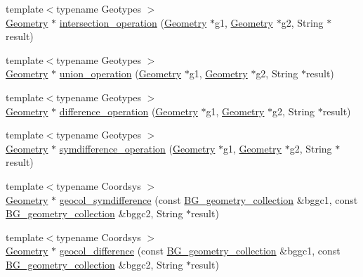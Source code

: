 \begin{DoxyCompactItemize}
{\footnotesize template$<$typename Geotypes $>$ }\\\mbox{\hyperlink{classGeometry}{Geometry}} $\ast$ \mbox{\hyperlink{classItem__func__spatial__operation_ac3f0b6c08ba648eafb07e6c274ee9c59}{intersection\+\_\+operation}} (\mbox{\hyperlink{classGeometry}{Geometry}} $\ast$g1, \mbox{\hyperlink{classGeometry}{Geometry}} $\ast$g2, String $\ast$result)
\item 
{\footnotesize template$<$typename Geotypes $>$ }\\\mbox{\hyperlink{classGeometry}{Geometry}} $\ast$ \mbox{\hyperlink{classItem__func__spatial__operation_a8d9dbfc298e9f8a3fbf140168e992197}{union\+\_\+operation}} (\mbox{\hyperlink{classGeometry}{Geometry}} $\ast$g1, \mbox{\hyperlink{classGeometry}{Geometry}} $\ast$g2, String $\ast$result)
\item 
{\footnotesize template$<$typename Geotypes $>$ }\\\mbox{\hyperlink{classGeometry}{Geometry}} $\ast$ \mbox{\hyperlink{classItem__func__spatial__operation_a3c362428b07f46f367c2e1e35f17cf40}{difference\+\_\+operation}} (\mbox{\hyperlink{classGeometry}{Geometry}} $\ast$g1, \mbox{\hyperlink{classGeometry}{Geometry}} $\ast$g2, String $\ast$result)
\item 
{\footnotesize template$<$typename Geotypes $>$ }\\\mbox{\hyperlink{classGeometry}{Geometry}} $\ast$ \mbox{\hyperlink{classItem__func__spatial__operation_ae775d509dca190eff1d735dd13c512a7}{symdifference\+\_\+operation}} (\mbox{\hyperlink{classGeometry}{Geometry}} $\ast$g1, \mbox{\hyperlink{classGeometry}{Geometry}} $\ast$g2, String $\ast$result)
\item 
{\footnotesize template$<$typename Coordsys $>$ }\\\mbox{\hyperlink{classGeometry}{Geometry}} $\ast$ \mbox{\hyperlink{classItem__func__spatial__operation_ae1b75a16acf6064441032b4f2219edb4}{geocol\+\_\+symdifference}} (const \mbox{\hyperlink{classBG__geometry__collection}{B\+G\+\_\+geometry\+\_\+collection}} \&bggc1, const \mbox{\hyperlink{classBG__geometry__collection}{B\+G\+\_\+geometry\+\_\+collection}} \&bggc2, String $\ast$result)
\item 
{\footnotesize template$<$typename Coordsys $>$ }\\\mbox{\hyperlink{classGeometry}{Geometry}} $\ast$ \mbox{\hyperlink{classItem__func__spatial__operation_a66f93912a837031cc66af8c61f63c6b6}{geocol\+\_\+difference}} (const \mbox{\hyperlink{classBG__geometry__collection}{B\+G\+\_\+geometry\+\_\+collection}} \&bggc1, const \mbox{\hyperlink{classBG__geometry__collection}{B\+G\+\_\+geometry\+\_\+collection}} \&bggc2, String $\ast$result)

\end{DoxyCompactItemize}
